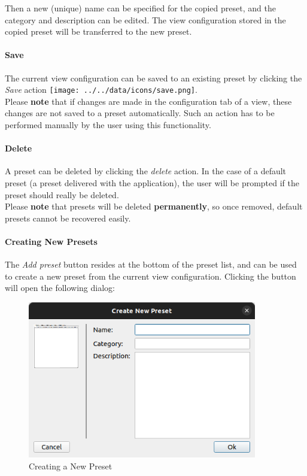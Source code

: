 Then a new (unique) name can be specified for the copied preset, and the category and description can be edited.
The view configuration stored in the copied preset will be transferred to the new preset.

\paragraph*{Save} The current view configuration can be saved to an existing preset by clicking the \textit{Save} action \texttt{[image: ../../data/icons/save.png]}. \\

Please \textbf{note} that if changes are made in the configuration tab of a view, these changes are not saved to a preset automatically. 
Such an action has to be performed manually by the user using this functionality.

\paragraph*{Delete} A preset can be deleted by clicking the \textit{delete} action.
In the case of a default preset (a preset delivered with the application), the user will be prompted if the preset should really
be deleted. \\

Please \textbf{note} that presets will be deleted \textbf{permanently}, so once removed, default presets cannot be recovered easily.

\paragraph*{Creating New Presets} The \textit{Add preset} button resides at the bottom of the preset list, 
and can be used to create a new preset from the current view configuration. Clicking the button will open the following dialog:

\begin{figure}[H]
    \center
    \includegraphics[width=10cm]{figures/view_preset_add.png}
  \caption{Creating a New Preset}
\end{figure}

